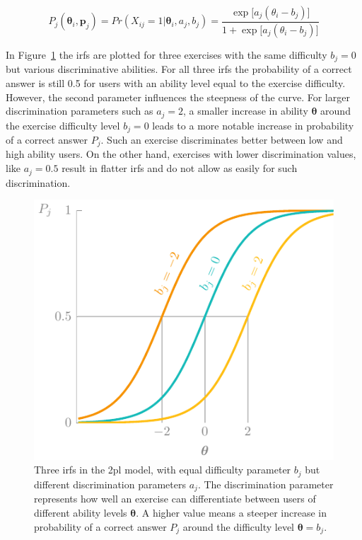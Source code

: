 \begin{equation}
    \label{eq:2pl}
    P_{j}(\bm{\theta}_i,\bm{p}_j) =
    Pr(X_{ij} = 1 | \bm{\theta}_i,a_j,b_j) =
    \frac{\exp\big[a_j(\theta_i - b_j)\big]}{1 + \exp\big[a_j(\theta_i - b_j)\big]}
\end{equation}

In Figure~\ref{fig:2pl} the \glspl{irf} are plotted for three exercises with the same difficulty $b_j = 0$ but various discriminative abilities. 
For all three \glspl{irf} the probability of a correct answer is still 0.5 for users with an ability level equal to the exercise difficulty.
However, the second parameter influences the steepness of the curve.
For larger discrimination parameters such as $a_j = 2$, a smaller increase in ability $\bm\theta$ around the exercise difficulty level $b_j = 0$ leads to a more notable increase in probability of a correct answer $P_j$.
Such an exercise discriminates better between low and high ability users.
On the other hand, exercises with lower discrimination values, like $a_j = 0.5$ result in flatter \glspl{irf} and do not allow as easily for such discrimination.

\begin{figure}
    \centering
    \includegraphics[page=2]{03-education/figures/tikzfigures.pdf}
    \caption[Item response functions of the 2PL model]{Three \glspl{irf} in the \gls{2pl} model, with equal difficulty parameter $b_j$ but different discrimination parameters $a_j$. The discrimination parameter represents how well an exercise can differentiate between users of different ability levels $\bm\theta$. A higher value means a steeper increase in probability of a correct answer $P_j$ around the difficulty level $\bm\theta = b_j$.}
    \label{fig:2pl}
\end{figure}

